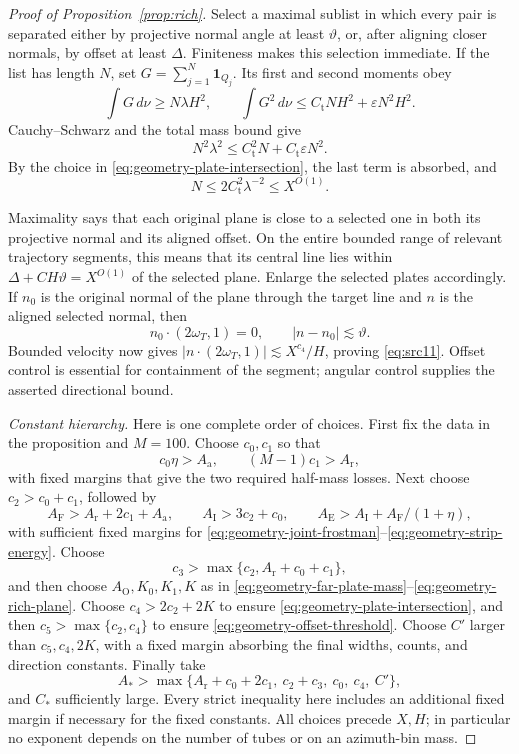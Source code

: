 \begin{proof}[Proof of Proposition~\ref{prop:rich}]
Select a maximal sublist in which every pair is separated either
by projective normal angle at least $\vartheta$, or, after aligning
closer normals, by offset at least $\Delta$. Finiteness makes this
selection immediate. If the list has length $N$, set
$G=\sum_{j=1}^N\mathbf1_{Q_j}$. Its first and second moments obey
\[
 \int G\,d\nu\geq N\lambda H^2,
 \qquad
 \int G^2\,d\nu\leq C_{\mathrm t}NH^2+\varepsilon N^2H^2.
\]
Cauchy--Schwarz and the total mass bound give
\[
 N^2\lambda^2
 \leq C_{\mathrm t}^2N+C_{\mathrm t}\varepsilon N^2.
\]
By the choice in \eqref{eq:geometry-plate-intersection}, the last
term is absorbed, and
\begin{equation}\label{eq:geometry-plate-count}
 N\leq2C_{\mathrm t}^2\lambda^{-2}\leq X^{O(1)}.
\end{equation}

Maximality says that each original plane is close to a selected
one in both its projective normal and its aligned offset. On the
entire bounded range of relevant trajectory segments, this means
that its central line lies within
$\Delta+CH\vartheta=X^{O(1)}$ of the selected plane. Enlarge the
selected plates accordingly. If $n_0$ is the original normal of
the plane through the target line and $n$ is the aligned selected
normal, then
\[
 n_0\cdot(2\omega_T,1)=0,\qquad |n-n_0|\lesssim\vartheta.
\]
Bounded velocity now gives
$|n\cdot(2\omega_T,1)|\lesssim X^{c_4}/H$, proving
\eqref{eq:src11}. Offset control is essential for containment of
the segment; angular control supplies the asserted directional
bound.

\emph{Constant hierarchy.}
Here is one complete order of choices. First fix the data in the
proposition and $M=100$. Choose $c_0,c_1$ so that
\[
 c_0\eta>A_{\mathrm a},\qquad
 (M-1)c_1>A_{\mathrm r},
\]
with fixed margins that give the two required half-mass losses.
Next choose $c_2>c_0+c_1$, followed by
\[
 A_{\mathrm F}>A_{\mathrm r}+2c_1+A_{\mathrm a},\qquad
 A_{\mathrm I}>3c_2+c_0,\qquad
 A_{\mathrm E}>A_{\mathrm I}+A_{\mathrm F}/(1+\eta),
\]
with sufficient fixed margins for
\eqref{eq:geometry-joint-frostman}--\eqref{eq:geometry-strip-energy}.
Choose
\[
 c_3>\max\{c_2,A_{\mathrm r}+c_0+c_1\},
\]
and then choose $A_{\mathrm O},K_0,K_1,K$ as in
\eqref{eq:geometry-far-plate-mass}--\eqref{eq:geometry-rich-plane}.
Choose $c_4>2c_2+2K$ to ensure
\eqref{eq:geometry-plate-intersection}, and then
$c_5>\max\{c_2,c_4\}$ to ensure
\eqref{eq:geometry-offset-threshold}. Choose $C'$ larger than
$c_5,c_4,2K$, with a fixed margin absorbing the final widths,
counts, and direction constants. Finally take
\[
 A_*>\max\{A_{\mathrm r}+c_0+2c_1,\ c_2+c_3,\ c_0,\ c_4,\ C'\},
\]
and $C_*$ sufficiently large. Every strict inequality here includes
an additional fixed margin if necessary for the fixed constants.
All choices precede $X,H$; in particular no exponent depends on
the number of tubes or on an azimuth-bin mass.
\end{proof}

